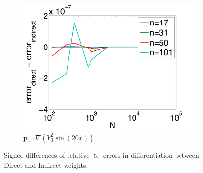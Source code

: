 \begin{figure}[htbp]
\begin{subfigure}[b]{0.425\textwidth}
	\includegraphics[width=1.0\textwidth]{../figures/chapter2/compare_weight_generation/xsfc_vs_xsfc_alt_on_sph32_times_sine_20x/diff_of_rel_l2_errors.pdf}
	\caption{$\mathbf{p}_{x} \cdot \nabla ( Y_{3}^{2} \sin(20 x))$}
	\end{subfigure}
	\caption{Signed differences of relative $\ell_{2}$ errors in differentiation between Direct and Indirect weights.}
\end{figure}


